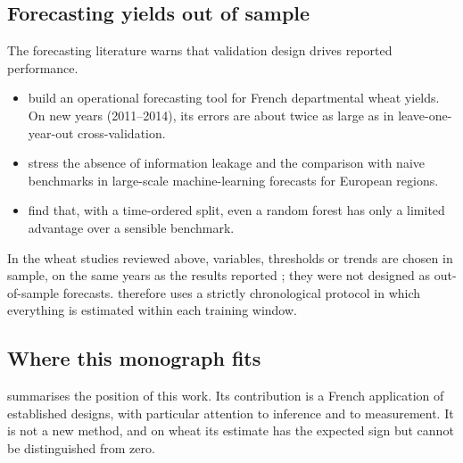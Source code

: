 \subsection{Forecasting yields out of sample}

The forecasting literature warns that validation design drives reported performance.
\begin{itemize}
  \item \textcite{gouache2015} build an operational forecasting tool for French departmental wheat yields. On new years (2011--2014), its errors are about twice as large as in leave-one-year-out cross-validation.
  \item \textcite{paudel2021} stress the absence of information leakage and the comparison with naive benchmarks in large-scale machine-learning forecasts for European regions.
  \item \textcite{morales2023} find that, with a time-ordered split, even a random forest has only a limited advantage over a sensible benchmark.
\end{itemize}
In the wheat studies reviewed above, variables, thresholds or trends are chosen in sample, on the same years as the results reported \parencite{benari2018,noiajunior2025}; they were not designed as out-of-sample forecasts.  therefore uses a strictly chronological protocol in which everything is estimated within each training window.

\subsection{Where this monograph fits}

 summarises the position of this work. Its contribution is a French application of established designs, with particular attention to inference and to measurement. It is not a new method, and on wheat its estimate has the expected sign but cannot be distinguished from zero.

